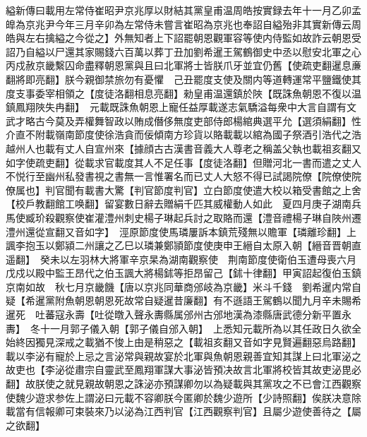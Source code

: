 縊新傳曰載用左常侍崔昭尹京兆厚以財結其黨皇甫温周皓按實録去年十一月乙卯孟皥為京兆尹今年三月辛卯為左常侍未嘗言崔昭為京兆也奉詔自縊殆非其實新傳云周皓與左右擒縊之今從之】外無知者上下詔罷朝恩觀軍容等使内侍監如故詐云朝恩受詔乃自縊以尸還其家賜錢六百萬以葬丁丑加劉希暹王駕鶴御史中丞以慰安北軍之心丙戍赦京畿繫囚命盡釋朝恩黨與且曰北軍將士皆朕爪牙並宜仍舊【使疏吏翻暹息亷翻將即亮翻】朕今親御禁旅勿有憂懼　己丑罷度支使及關内等道轉運常平鹽鐵使其度支事委宰相領之【度徒洛翻相息亮翻】勑皇甫温還鎮於陜【既誅魚朝恩不復以温鎮鳳翔陜失冉翻】　元載既誅魚朝恩上寵任益厚載遂志氣驕溢每衆中大言自謂有文武才略古今莫及弄權舞智政以賄成僭侈無度吏部侍郎楊綰典選平允【選須絹翻】性介直不附載嶺南節度使徐浩貪而佞傾南方珍貨以賂載載以綰為國子祭酒引浩代之浩越州人也載有丈人自宣州來【據顔古古漢書音義大人尊老之稱盖父執也載祖亥翻又如字使疏吏翻】從載求官載度其人不足任事【度徒洛翻】但贈河北一書而遣之丈人不悦行至幽州私發書視之書無一言惟署名而已丈人大怒不得已試謁院僚【院僚使院僚属也】判官聞有載書大驚【判官節度判官】立白節度使遣大校以箱受書館之上舍【校戶教翻館工唤翻】留宴數日辭去贈絹千匹其威權動人如此　夏四月庚子湖南兵馬使臧玠殺觀察使崔灌澧州刺史楊子琳起兵討之取賂而還【澧音禮楊子琳自陜州遷澧州還從宣翻又音如字】　涇原節度使馬璘屢訴本鎮荒殘無以贍軍【璘離珍翻】上諷李抱玉以鄭潁二州讓之乙巳以璘兼鄭頴節度使庚申王縉自太原入朝【縉音晋朝直遥翻】　癸未以左羽林大將軍辛京杲為湖南觀察使　荆南節度使衛伯玉遭母喪六月戊戍以殿中監王昂代之伯玉諷大將楊鉥等拒昂留己【鉥十律翻】甲寅詔起復伯玉鎮京南如故　秋七月京畿饑【唐以京兆同華商邠岐為京畿】米斗千錢　劉希暹内常自疑【希暹黨附魚朝恩朝恩死故常自疑暹昔廉翻】有不遜語王駕鶴以聞九月辛未賜希暹死　吐蕃寇永壽【吐從暾入聲永夀縣属邠州古邠地漢為漆縣唐武德分新平置永夀】　冬十一月郭子儀入朝【郭子儀自邠入朝】　上悉知元載所為以其任政日久欲全始終因獨見深戒之載猶不悛上由是稍惡之【載祖亥翻又音如字見賢遍翻惡烏路翻】載以李泌有寵於上忌之言泌常與親故宴於北軍與魚朝恩親善宜知其謀上曰北軍泌之故吏也【李泌從肅宗自靈武至鳳翔軍謀大事泌皆預决故言北軍將校皆其故吏泌毘必翻】故朕使之就見親故朝恩之誅泌亦預謀卿勿以為疑載與其黨攻之不已會江西觀察使魏少遊求参佐上謂泌曰元載不容卿朕今匿卿於魏少遊所【少詩照翻】俟朕决意除載當有信報卿可束裝來乃以泌為江西判官【江西觀察判官】且屬少遊使善待之【屬之欲翻】

